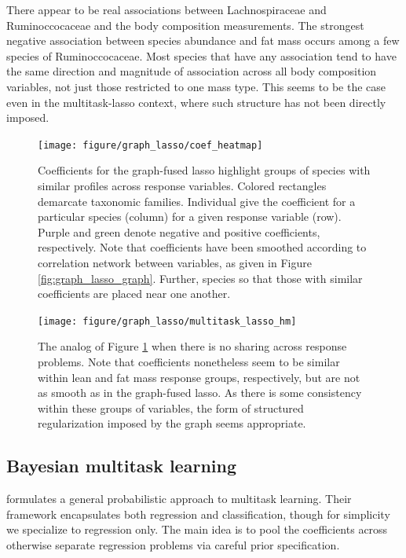 \documentclass[14pt]{extarticle}
\begin{document}
There appear to be real associations between Lachnospiraceae and Ruminoccocaceae
and the body composition measurements. The strongest negative association
between species abundance and fat mass occurs among a few species of
Ruminoccocaceae. Most species that have any association tend to have the same
direction and magnitude of association across all body composition variables,
not just those restricted to one mass type. This seems to be the case even in
the multitask-lasso context, where such structure has not been directly imposed.

\begin{figure}
  \centering
  \texttt{[image: figure/graph\_lasso/coef\_heatmap]}
  \caption{Coefficients for the graph-fused lasso highlight groups of species
    with similar profiles across response
    variables. Colored rectangles demarcate taxonomic families. Individual give
    the coefficient for a particular species (column) for a given response
    variable (row). Purple and green denote negative and positive coefficients,
    respectively. Note that coefficients have been smoothed according to
    correlation network between variables, as given in Figure
    \ref{fig:graph_lasso_graph}. Further, species so that those with similar
    coefficients are placed near one
    another. \label{fig:graph_lasso_coef_heatmap} }
\end{figure}

\begin{figure}
  \centering
  \texttt{[image: figure/graph\_lasso/multitask\_lasso\_hm]}
  \caption{The analog of Figure \ref{fig:graph_lasso_coef_heatmap} when there is
    no sharing across response problems. Note that coefficients nonetheless seem
    to be similar within lean and fat mass response groups, respectively, but
    are not as smooth as in the graph-fused lasso. As there is some consistency
    within these groups of variables, the form of structured regularization
    imposed by the graph seems
    appropriate. \label{fig:graph_lasso_multitask_lasso_hm} }
\end{figure}

\subsection{Bayesian multitask learning}

\cite{zhang2005learning} formulates a general probabilistic approach to
multitask learning. Their framework encapsulates both regression and
classification, though for simplicity we specialize to regression only. The main
idea is to pool the coefficients across otherwise separate regression problems
via careful prior specification.
\end{document}
